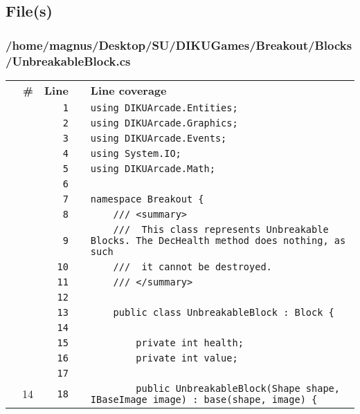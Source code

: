 \documentclass[a4paper,landscape,10pt]{article}
\begin{document}
\subsection{File(s)}
\subsubsection{/home/magnus/Desktop/SU/DIKUGames/Breakout/Blocks/UnbreakableBlock.cs}
\begin{longtable}[l]{lrrll}
\textbf{} & \textbf{\#} & \textbf{Line} & \textbf{} & \textbf{Line coverage}\\
\cellcolor{gray} &  & \verb~1~ & & \verb~using DIKUArcade.Entities;~\\
\cellcolor{gray} &  & \verb~2~ & & \verb~using DIKUArcade.Graphics;~\\
\cellcolor{gray} &  & \verb~3~ & & \verb~using DIKUArcade.Events;~\\
\cellcolor{gray} &  & \verb~4~ & & \verb~using System.IO;~\\
\cellcolor{gray} &  & \verb~5~ & & \verb~using DIKUArcade.Math;~\\
\cellcolor{gray} &  & \verb~6~ & & \verb~~\\
\cellcolor{gray} &  & \verb~7~ & & \verb~namespace Breakout {~\\
\cellcolor{gray} &  & \verb~8~ & & \verb~    /// <summary>~\\
\cellcolor{gray} &  & \verb~9~ & & \verb~    ///  This class represents Unbreakable Blocks. The DecHealth method does nothing, as such~\\
\cellcolor{gray} &  & \verb~10~ & & \verb~    ///  it cannot be destroyed.~\\
\cellcolor{gray} &  & \verb~11~ & & \verb~    /// </summary>~\\
\cellcolor{gray} &  & \verb~12~ & & \verb~~\\
\cellcolor{gray} &  & \verb~13~ & & \verb~    public class UnbreakableBlock : Block {~\\
\cellcolor{gray} &  & \verb~14~ & & \verb~~\\
\cellcolor{gray} &  & \verb~15~ & & \verb~        private int health;~\\
\cellcolor{gray} &  & \verb~16~ & & \verb~        private int value;~\\
\cellcolor{gray} &  & \verb~17~ & & \verb~~\\
\cellcolor{green} & 14 & \verb~18~ & & \verb~        public UnbreakableBlock(Shape shape, IBaseImage image) : base(shape, image) {~\\

\end{longtable}
\end{document}
